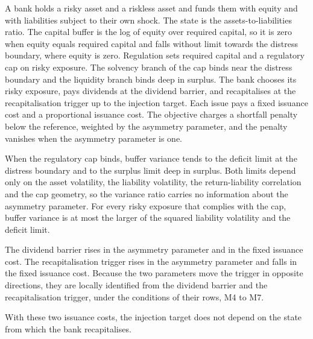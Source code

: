 A bank holds a risky asset and a riskless asset and funds them with equity
and with liabilities subject to their own shock. The state is the assets-to-liabilities ratio. The capital buffer is the log
of equity over required capital, so it is zero when equity equals required
capital and falls without limit towards the distress boundary, where equity
is zero. Regulation sets required capital and a regulatory cap on risky
exposure. The solvency branch of the cap binds near the distress boundary
and the liquidity branch binds deep in surplus. The bank chooses its risky
exposure, pays dividends at the dividend barrier, and recapitalises at the
recapitalisation trigger up to the injection target. Each issue pays a fixed
issuance cost and a proportional issuance cost. The objective charges a
shortfall penalty below the reference, weighted by the asymmetry parameter,
and the penalty vanishes when the asymmetry parameter is one.

When the regulatory cap binds, buffer variance tends to the deficit limit at
the distress boundary and to the surplus limit deep in surplus. Both limits
depend only on the asset volatility, the liability volatility, the
return-liability correlation and the cap geometry, so the variance ratio carries no
information about the asymmetry parameter. For every risky exposure that
complies with the cap, buffer variance is at most the larger
of the squared liability volatility and the deficit limit.

The dividend barrier rises in the asymmetry parameter and in the fixed
issuance cost. The recapitalisation trigger rises in the asymmetry parameter
and falls in the fixed issuance cost. Because the two parameters move the
trigger in opposite directions, they are locally identified from the
dividend barrier and the recapitalisation trigger, under the conditions of
their rows, M4 to M7.

With these two issuance costs, the injection
target does not depend on the state from which the bank recapitalises.

